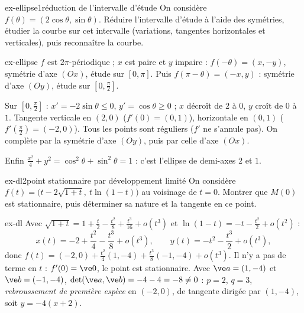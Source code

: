 
\begin{exo}{ex-ellipse}{1}{réduction de l'intervalle d'étude}
On considère $f(\theta)=(2\cos\theta,\sin\theta)$. Réduire l'intervalle d'étude à l'aide des symétries, étudier la courbe sur cet intervalle (variations, tangentes horizontales et verticales), puis reconnaître la courbe.
\end{exo}

\begin{corrige}{ex-ellipse}
$f$ est $2\pi$-périodique ; $x$ est paire et $y$ impaire : $f(-\theta)=(x,-y)$, symétrie d'axe $(Ox)$, étude sur $[0,\pi]$. Puis $f(\pi-\theta)=(-x,y)$ : symétrie d'axe $(Oy)$, étude sur $\left[0,\frac\pi2\right]$.

Sur $\left[0,\frac\pi2\right]$ : $x'=-2\sin\theta\leq0$, $y'=\cos\theta\geq0$ ; $x$ décroît de $2$ à $0$, $y$ croît de $0$ à $1$. Tangente verticale en $(2,0)$ ($f'(0)=(0,1)$), horizontale en $(0,1)$ ($f'(\frac\pi2)=(-2,0)$). Tous les points sont réguliers ($f'$ ne s'annule pas). On complète par la symétrie d'axe $(Oy)$, puis par celle d'axe $(Ox)$.

Enfin $\frac{x^2}4+y^2=\cos^2\theta+\sin^2\theta=1$ : c'est l'ellipse de demi-axes $2$ et $1$.
\end{corrige}

\begin{exo}{ex-dl}{2}{point stationnaire par développement limité}
On considère $f(t)=\big(t-2\sqrt{1+t},\ t\ln(1-t)\big)$ au voisinage de $t=0$. Montrer que $M(0)$ est stationnaire, puis déterminer sa nature et la tangente en ce point.
\end{exo}

\begin{corrige}{ex-dl}
Avec $\sqrt{1+t}=1+\frac t2-\frac{t^2}8+\frac{t^3}{16}+o(t^3)$ et $\ln(1-t)=-t-\frac{t^2}2+o(t^2)$ :
\[x(t)=-2+\frac{t^2}4-\frac{t^3}8+o(t^3),\qquad y(t)=-t^2-\frac{t^3}2+o(t^3),\]
donc $f(t)=(-2,0)+\frac{t^2}4(1,-4)+\frac{t^3}8(-1,-4)+o(t^3)$. Il n'y a pas de terme en $t$ : $f'(0)=\ve0$, le point est stationnaire. Avec $\ve a=(1,-4)$ et $\ve b=(-1,-4)$, $\det(\ve a,\ve b)=-4-4=-8\neq0$ : $p=2$, $q=3$, \emph{rebroussement de première espèce} en $(-2,0)$, de tangente dirigée par $(1,-4)$, soit $y=-4(x+2)$.
\end{corrige}

